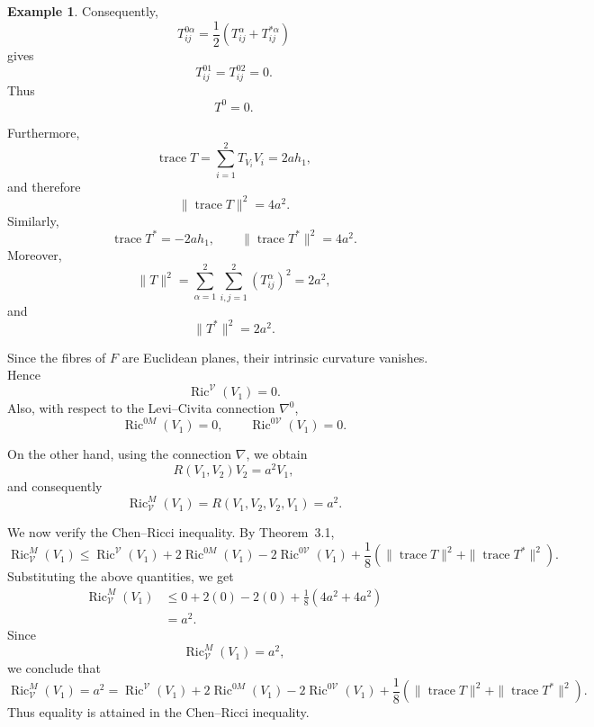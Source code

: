 \documentclass[10pt,a4paper]{article}
\theoremstyle{definition}
\newtheorem{example}[theorem]{Example}
\theoremstyle{remark}
\numberwithin{equation}{section}
\begin{document}
\begin{example}
Consequently,
\[
T^{0\alpha}_{ij}
=\frac{1}{2}
\left(T^{\alpha}_{ij}+T^{*\alpha}_{ij}\right)
\]
gives
\[
T^{01}_{ij}=T^{02}_{ij}=0.
\]
Thus
\[
T^{0}=0.
\]

Furthermore,
\[
\operatorname{trace}T
=\sum_{i=1}^{2}T_{V_{i}}V_{i}
=2ah_{1},
\]
and therefore
\[
\|\operatorname{trace}T\|^{2}=4a^{2}.
\]
Similarly,
\[
\operatorname{trace}T^{*}=-2ah_{1},
\qquad
\|\operatorname{trace}T^{*}\|^{2}=4a^{2}.
\]
Moreover,
\[
\|T\|^{2}
=\sum_{\alpha=1}^{2}\sum_{i,j=1}^{2}
\left(T^{\alpha}_{ij}\right)^{2}
=2a^{2},
\]
and
\[
\|T^{*}\|^{2}=2a^{2}.
\]

Since the fibres of $F$ are Euclidean planes, their intrinsic
curvature vanishes. Hence
\[
\operatorname{Ric}^{\mathcal V}(V_{1})=0.
\]
Also, with respect to the Levi--Civita connection $\nabla^{0}$,
\[
\operatorname{Ric}^{0M}(V_{1})=0,
\qquad
\operatorname{Ric}^{0\mathcal V}(V_{1})=0.
\]

On the other hand, using the connection $\nabla$, we obtain
\[
R(V_{1},V_{2})V_{2}=a^{2}V_{1},
\]
and consequently
\[
\operatorname{Ric}^{M}_{\mathcal V}(V_{1})
=
R(V_{1},V_{2},V_{2},V_{1})
=a^{2}.
\]

We now verify the Chen--Ricci inequality. By Theorem~3.1,
\[
\operatorname{Ric}^{M}_{\mathcal V}(V_{1})
\leq
\operatorname{Ric}^{\mathcal V}(V_{1})
+2\operatorname{Ric}^{0M}(V_{1})
-2\operatorname{Ric}^{0\mathcal V}(V_{1})
+\frac{1}{8}
\left(
\|\operatorname{trace}T\|^{2}
+
\|\operatorname{trace}T^{*}\|^{2}
\right).
\]
Substituting the above quantities, we get
\[
\begin{aligned}
\operatorname{Ric}^{M}_{\mathcal V}(V_{1})
&\leq
0+2(0)-2(0)
+\frac18(4a^{2}+4a^{2})\\
&=a^{2}.
\end{aligned}
\]
Since
\[
\operatorname{Ric}^{M}_{\mathcal V}(V_{1})=a^{2},
\]
we conclude that
\[
\boxed{
\operatorname{Ric}^{M}_{\mathcal V}(V_{1})
=
a^{2}
=
\operatorname{Ric}^{\mathcal V}(V_{1})
+2\operatorname{Ric}^{0M}(V_{1})
-2\operatorname{Ric}^{0\mathcal V}(V_{1})
+\frac18
\left(
\|\operatorname{trace}T\|^{2}
+
\|\operatorname{trace}T^{*}\|^{2}
\right)
}.
\]
Thus equality is attained in the Chen--Ricci inequality.


\end{example}
\end{document}
